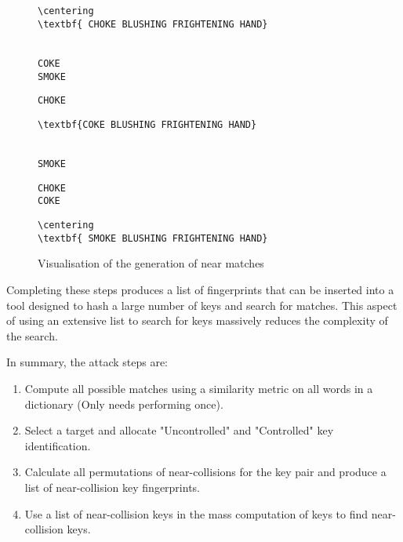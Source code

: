 \begin{figure}[h!]
    \centering
    \begin{BVerbatim}[commandchars=\\\{\}]
        \centering
\textbf{ CHOKE BLUSHING FRIGHTENING HAND}
    \end{BVerbatim}
    \\
    \verb|COKE                           |
    \\
    \verb|SMOKE                          |
    \\
    \hspace{1cm}



    \verb|CHOKE                          |
    \\
    \begin{BVerbatim}[commandchars=\\\{\}]
\textbf{COKE BLUSHING FRIGHTENING HAND}
    \end{BVerbatim}
    \\
    \verb|SMOKE                          |
    \\
    \hspace{1cm}


    \verb|CHOKE                          |
    \\
    \verb|COKE                           |
    \\
    \begin{BVerbatim}[commandchars=\\\{\}]
        \centering
\textbf{ SMOKE BLUSHING FRIGHTENING HAND}
    \end{BVerbatim}
    \caption{Visualisation of the generation of near matches}
    \label{fig:nearMatch}
\end{figure}

Completing these steps produces a list of fingerprints that can be inserted into a tool designed to hash a large number of keys and search for matches. This aspect of using an extensive list to search for keys massively reduces the complexity of the search.

In summary, the attack steps are:

\begin{enumerate}
    \item Compute all possible matches using a similarity metric on all words in a dictionary (Only needs performing once).

    \item Select a target and allocate "Uncontrolled" and "Controlled" key identification.
    
    \item Calculate all permutations of near-collisions for the key pair and produce a list of near-collision key fingerprints.
    
    \item Use a list of near-collision keys in the mass computation of keys to find near-collision keys.

\end{enumerate}

